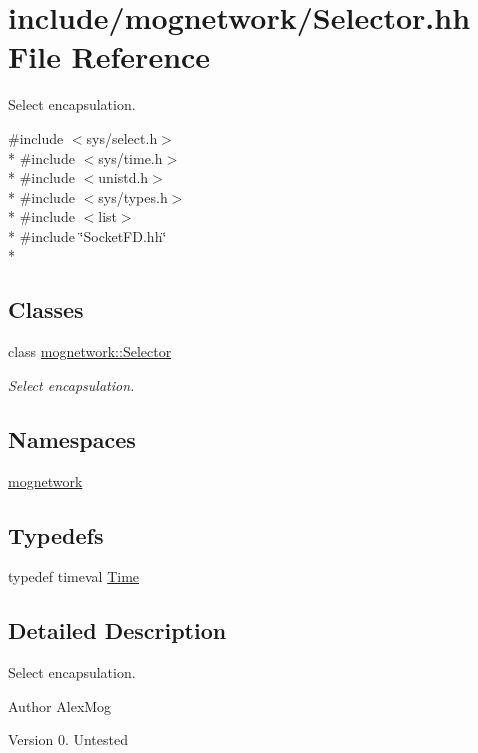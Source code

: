 \hypertarget{_selector_8hh}{\section{include/mognetwork/\-Selector.hh File Reference}
\label{_selector_8hh}
}


Select encapsulation.  


{\ttfamily \#include $<$sys/select.\-h$>$}\\*
{\ttfamily \#include $<$sys/time.\-h$>$}\\*
{\ttfamily \#include $<$unistd.\-h$>$}\\*
{\ttfamily \#include $<$sys/types.\-h$>$}\\*
{\ttfamily \#include $<$list$>$}\\*
{\ttfamily \#include \char`\"{}Socket\-F\-D.\-hh\char`\"{}}\\*
\subsection*{Classes}
\begin{DoxyCompactItemize}
\item 
class \hyperlink{classmognetwork_1_1_selector}{mognetwork\-::\-Selector}
\begin{DoxyCompactList}\small\item\em Select encapsulation. \end{DoxyCompactList}\end{DoxyCompactItemize}
\subsection*{Namespaces}
\begin{DoxyCompactItemize}
\item 
\hyperlink{namespacemognetwork}{mognetwork}
\end{DoxyCompactItemize}
\subsection*{Typedefs}
\begin{DoxyCompactItemize}
\item 
typedef timeval \hyperlink{_selector_8hh_af47ac292ef7224cf549b944d138ba4ae}{Time}
\end{DoxyCompactItemize}


\subsection{Detailed Description}
Select encapsulation. \begin{DoxyAuthor}{Author}
Alex\-Mog 
\end{DoxyAuthor}
\begin{DoxyVersion}{Version}
0.  Untested 
\end{DoxyVersion}



